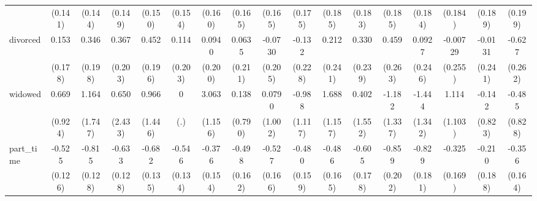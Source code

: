 {\begin{tabular}{l*{16}{c}}
                    &     (0.141)         &     (0.144)         &     (0.149)         &     (0.150)         &     (0.154)         &     (0.160)         &     (0.165)         &     (0.165)         &     (0.175)         &     (0.185)         &     (0.183)         &     (0.185)         &     (0.184)         &     (0.184)         &     (0.189)         &     (0.199)         \\
[1em]
divorced            &       0.153         &       0.346         &       0.367         &       0.452\sym{*}  &       0.114         &      0.0940         &      0.0635         &     -0.0730         &      -0.132         &       0.212         &       0.330         &       0.459         &      0.0927         &    -0.00729         &     -0.0131         &      -0.627\sym{*}  \\
                    &     (0.178)         &     (0.198)         &     (0.203)         &     (0.196)         &     (0.203)         &     (0.200)         &     (0.211)         &     (0.205)         &     (0.228)         &     (0.241)         &     (0.239)         &     (0.263)         &     (0.246)         &     (0.255)         &     (0.241)         &     (0.262)         \\
[1em]
widowed             &       0.669         &       1.164         &       0.650         &       0.966         &           0         &       3.063\sym{**} &       0.138         &      0.0790         &      -0.988         &       1.688         &       0.402         &      -1.182         &      -1.444         &       1.114         &      -0.142         &      -0.485         \\
                    &     (0.924)         &     (1.747)         &     (2.433)         &     (1.446)         &         (.)         &     (1.156)         &     (0.790)         &     (1.002)         &     (1.117)         &     (1.157)         &     (1.552)         &     (1.337)         &     (1.342)         &     (1.103)         &     (0.823)         &     (0.828)         \\
[1em]
part\_time           &      -0.525\sym{***}&      -0.815\sym{***}&      -0.633\sym{***}&      -0.682\sym{***}&      -0.546\sym{***}&      -0.376\sym{*}  &      -0.498\sym{**} &      -0.527\sym{**} &      -0.480\sym{**} &      -0.486\sym{**} &      -0.605\sym{***}&      -0.859\sym{***}&      -0.829\sym{***}&      -0.325         &      -0.210         &      -0.356\sym{*}  \\
                    &     (0.126)         &     (0.128)         &     (0.128)         &     (0.135)         &     (0.134)         &     (0.154)         &     (0.162)         &     (0.166)         &     (0.159)         &     (0.165)         &     (0.178)         &     (0.202)         &     (0.181)         &     (0.169)         &     (0.188)         &     (0.164)         \\

\end{tabular}}
